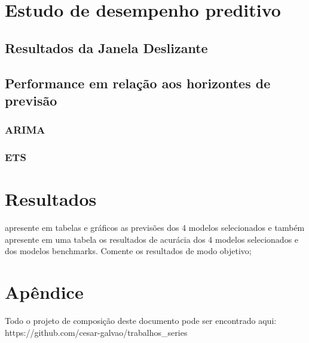 \documentclass[
  letterpaper,
  DIV=11,
  numbers=noendperiod]{scrartcl}
\begin{document}
\hypertarget{estudo-de-desempenho-preditivo}{%
\section{Estudo de desempenho
preditivo}\label{estudo-de-desempenho-preditivo}}

\hypertarget{resultados-da-janela-deslizante}{%
\subsection{Resultados da Janela
Deslizante}\label{resultados-da-janela-deslizante}}

\hypertarget{performance-em-relauxe7uxe3o-aos-horizontes-de-previsuxe3o}{%
\subsection{Performance em relação aos horizontes de
previsão}\label{performance-em-relauxe7uxe3o-aos-horizontes-de-previsuxe3o}}

\hypertarget{arima}{%
\subsubsection{ARIMA}\label{arima}}

\hypertarget{ets}{%
\subsubsection{ETS}\label{ets}}

\hypertarget{resultados}{%
\section{Resultados}\label{resultados}}

apresente em tabelas e gráficos as previsões dos 4 modelos selecionados
e também apresente em uma tabela os resultados de acurácia dos 4 modelos
selecionados e dos modelos benchmarks. Comente os resultados de modo
objetivo;

\hypertarget{apuxeandice}{%
\section{Apêndice}\label{apuxeandice}}

Todo o projeto de composição deste documento pode ser encontrado aqui:
https://github.com/cesar-galvao/trabalhos\_series
\end{document}

